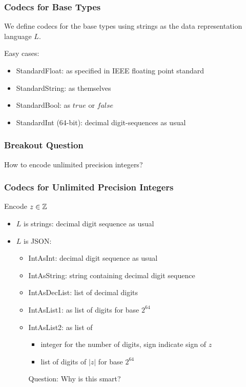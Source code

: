 \begin{frame}\frametitle{Codecs for Base Types}
We define codecs for the base types using strings as the data representation language $L$.

Easy cases:
\begin{itemize}
\item StandardFloat: as specified in IEEE floating point standard
\item StandardString: as themselves
\item StandardBool: as $true$ or $false$
\item StandardInt (64-bit): decimal digit-sequences as usual
\end{itemize}
\end{frame}

\begin{frame}\frametitle{Breakout Question}
How to encode unlimited precision integers?
\end{frame}

\begin{frame}\frametitle{Codecs for Unlimited Precision Integers}
Encode $z\in\mathbb{Z}$
\begin{itemize}
\item $L$ is strings: decimal digit sequence as usual
\item $L$ is JSON:
 \begin{itemize}
 \item IntAsInt: decimal digit sequence as usual
 \item IntAsString: string containing decimal digit sequence
 \item IntAsDecList: list of decimal digits
 \item IntAsList1: as list of digits for base $2^{64}$
 \item IntAsList2: as list of
   \begin{itemize}
   \item integer for the number of digits, sign indicate sign of $z$
   \item list of digits of $|z|$ for base $2^{64}$
   \end{itemize}
   Question: Why is this smart?
   
 \end{itemize}
\end{itemize}
\end{frame}

